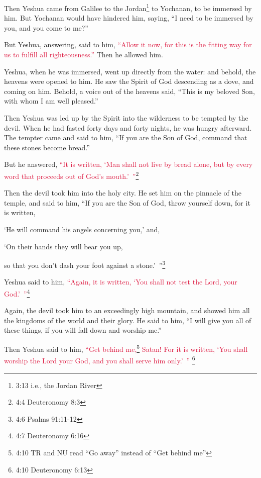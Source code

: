 \myverse{}Then Yeshua came from Galilee to the Jordan\footnote{3:13 i.e., the Jordan River} to Yochanan, to be immersed by him.
\myverse{}But Yochanan would have hindered him, saying, “I need to be immersed by you,
and you come to me?”

\myverse{}But Yeshua, answering, said to him,
\textcolor{crimson}{“Allow it now, for this is the fitting way for us to fulfill all righteousness.”} Then he allowed
him.

\myverse{}Yeshua, when he was immersed, went up directly from the water:
and behold, the heavens were opened to him. He saw the Spirit of God descending as a dove, and coming
on him.
\myverse{}Behold, a voice out of the heavens said, “This is my beloved Son, with whom
I am well pleased.”


\mychapter{} \myverse*{}Then Yeshua was led up by the Spirit into the wilderness to be
tempted by the devil.
\myverse{}When he had fasted forty days and forty nights, he was hungry afterward.
\myverse{}The tempter came and said to him, “If you are the Son of God, command that these
stones become bread.”

\myverse{}But he answered,
\textcolor{crimson}{“It is written, ‘Man shall not live by bread alone, but by every word that proceeds out of God’s mouth.’ ”}\footnote{4:4 Deuteronomy 8:3}

\myverse{}Then the devil took him into the holy city. He set him on the pinnacle
of the temple,
\myverse{}and said to him, “If you are the Son of God, throw yourself down, for it is
written,

‘He will command his angels concerning you,’ and,

‘On their hands they will bear you up,

so that you don’t dash your foot against a stone.’ ”\footnote{4:6 Psalms 91:11-12
}

\myverse{}Yeshua said to him,
\textcolor{crimson}{“Again, it is written, ‘You shall not test the Lord, your God.’ ”}\footnote{4:7 Deuteronomy 6:16}

\myverse{}Again, the devil took him to an exceedingly high mountain, and
showed him all the kingdoms of the world and their glory.
\myverse{}He said to him, “I will give you all of these things, if you will fall down
and worship me.”

\myverse{}Then Yeshua said to him,
\textcolor{crimson}{“Get behind me,}\footnote{4:10 TR and NU read “Go away” instead of “Get behind me”}
\textcolor{crimson}{Satan! For it is written, ‘You shall worship the Lord your God, and you shall serve him only.’ ”}
\footnote{4:10 Deuteronomy 6:13}

